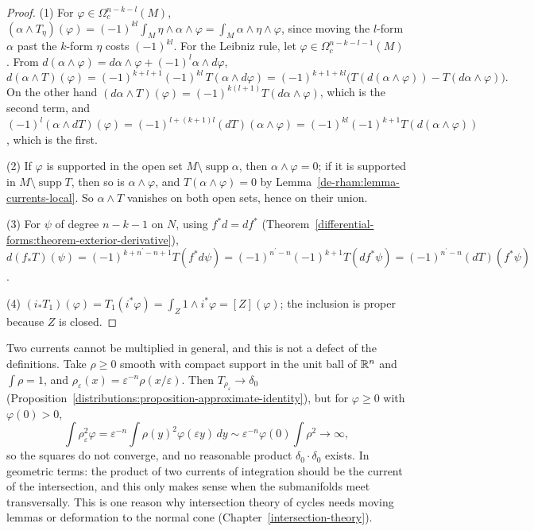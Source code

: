 \begin{proof}
(1) For $\varphi \in \Omega^{n-k-l}_c(M)$, $(\alpha \wedge T_\eta)(\varphi) = (-1)^{kl}\int_M\eta \wedge \alpha \wedge \varphi = \int_M\alpha \wedge \eta \wedge \varphi$, since moving the $l$-form $\alpha$ past the
$k$-form $\eta$ costs $(-1)^{kl}$. For the Leibniz rule, let $\varphi \in \Omega^{n-k-l-1}_c(M)$. From $d(\alpha \wedge \varphi) = d\alpha \wedge \varphi + (-1)^l\alpha \wedge d\varphi$,
\[
d(\alpha \wedge T)(\varphi) = (-1)^{k+l+1}(-1)^{kl}\,T(\alpha \wedge d\varphi) = (-1)^{k+1+kl}\bigl(T(d(\alpha \wedge \varphi)) - T(d\alpha \wedge \varphi)\bigr).
\]
On the other hand $(d\alpha \wedge T)(\varphi) = (-1)^{k(l+1)}T(d\alpha \wedge \varphi)$, which is the second term, and
$(-1)^l(\alpha \wedge dT)(\varphi) = (-1)^{l + (k+1)l}(dT)(\alpha \wedge \varphi) = (-1)^{kl}(-1)^{k+1}T(d(\alpha \wedge \varphi))$, which is the first.

(2) If $\varphi$ is supported in the open set $M \setminus \operatorname{supp}\alpha$, then $\alpha \wedge \varphi = 0$; if it is supported in $M \setminus \operatorname{supp}T$, then so is $\alpha \wedge \varphi$, and
$T(\alpha \wedge \varphi) = 0$ by Lemma~\ref{de-rham:lemma-currents-local}. So $\alpha \wedge T$ vanishes on both open sets, hence on their union.

(3) For $\psi$ of degree $n - k - 1$ on $N$, using $f^*d = df^*$ (Theorem~\ref{differential-forms:theorem-exterior-derivative}),
$d(f_*T)(\psi) = (-1)^{k + n^{\prime} - n + 1}T(f^*d\psi) = (-1)^{n^{\prime} - n}(-1)^{k+1}T(df^*\psi) = (-1)^{n^{\prime} - n}(dT)(f^*\psi)$.

(4) $(i_*T_1)(\varphi) = T_1(i^*\varphi) = \int_Z1 \wedge i^*\varphi = [Z](\varphi)$; the inclusion is proper because $Z$ is closed.
\end{proof}

\begin{remark}\label{de-rham:remark-current-products}
Two currents cannot be multiplied in general, and this is not a defect of the definitions. Take $\rho \geq 0$ smooth with compact support in the unit ball of $\mathbb{R}^n$ and $\int\rho = 1$, and
$\rho_\varepsilon(x) = \varepsilon^{-n}\rho(x/\varepsilon)$. Then $T_{\rho_\varepsilon} \to \delta_0$ (Proposition~\ref{distributions:proposition-approximate-identity}), but for $\varphi \geq 0$ with $\varphi(0) > 0$,
\[
\int\rho_\varepsilon^2\varphi = \varepsilon^{-n}\int\rho(y)^2\varphi(\varepsilon y)\,dy \sim \varepsilon^{-n}\varphi(0)\int\rho^2 \to \infty,
\]
so the squares do not converge, and no reasonable product $\delta_0 \cdot \delta_0$ exists. In geometric terms: the product of two currents of integration should be the current of the
intersection, and this only makes sense when the submanifolds meet transversally. This is one reason why intersection theory of cycles needs moving lemmas or deformation to the normal cone
(Chapter~\ref{intersection-theory}).
\end{remark}

